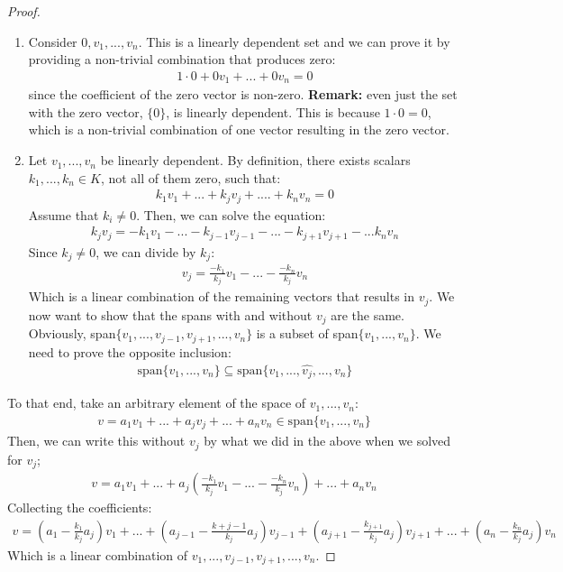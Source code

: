 \documentclass[11pt]{scrartcl}
\theoremstyle{definition}
\theoremstyle{remark}
\begin{document}
\begin{proof}
	\begin{enumerate}[noitemsep]
		\item Consider $0, v_1, ..., v_n$. This is a linearly dependent set and we can prove it by providing a non-trivial combination that produces zero: 
		\begin{align*}
			1 \cdot 0 + 0 v_1 + ... + 0 v_n = 0 
		\end{align*}
		since the coefficient of the zero vector is non-zero. \textbf{Remark:} even just the set with the zero vector, $\{ 0 \}$, is linearly dependent. This is because $1 \cdot 0 = 0$, which is a non-trivial combination of one vector resulting in the zero vector. 
		\item Let $v_1, ..., v_n$ be linearly dependent. By definition, there exists scalars $k_1, ..., k_n \in K$, not all of them zero, such that: 
		\begin{align*}
			k_1 v_1 + ... + k_j v_j + .... + k_n v_n = 0 
		\end{align*}
		Assume that $k_i \neq 0$. Then, we can solve the equation: 
		\begin{align*}
			k_j v_j = -k_1 v_1 - ... - k_{j-1} v_{j-1} - ... - k_{j+1} v_{j+1} - ... k_n v_n 
		\end{align*}
		Since $k_j \neq 0$, we can divide by $k_j$: 
		\begin{align*}
			v_j = \frac{-k_1}{k_j} v_1 - ... - \frac{-k_n}{k_j} v_n 
		\end{align*}
		Which is a linear combination of the remaining vectors that results in $v_j$. We now want to show that the spans with and without $v_j$ are the same. Obviously, span$\{ v_1, ..., v_{j-1}, v_{j+1}, ..., v_n \}$ is a subset of span$\{ v_1, ..., v_n \}$. We need to prove the opposite inclusion: 
		\begin{align*}
			\text{span} \{ v_1, ..., v_n \} \subseteq \text{span} \{ v_1, ..., \hat{v_j}, ..., v_n \} 
		\end{align*}
	\end{enumerate}
	To that end, take an arbitrary element of the space of $v_1, ..., v_n$: 
	\begin{align*}
		v = a_1 v_1 + ... + a_j v_j + ... + a_n v_n \in \text{span} \{ v_1, ..., v_n \} 
	\end{align*}
	Then, we can write this without $v_j$ by what we did in the above when we solved for $v_j$; 
	\begin{align*}
		v = a_1 v_1 + ... + a_j \left( \frac{-k_1}{k_j} v_1 - ... - \frac{-k_n}{k_j} v_n 	\right) + ... + a_n v_n 
	\end{align*}
	Collecting the coefficients: 
	\begin{align*}
		v = \left( a_1 - \frac{k_1}{k_j} a_j \right) v_1 + ... + \left( a_{j-1}  - \frac{k+{j-1}}{k_j} a_j \right) v_{j-1} + \left(a_{j+1} - \frac{k_{j+1}}{k_j} a_j \right)v_{j+1} + ... + \left(a_n - \frac{k_n}{k_j}a_j \right)v_n 
	\end{align*}
	Which is a linear combination of $v_1, ..., v_{j-1}, v_{j+1}, ..., v_n$. 
\end{proof}
\end{document}
